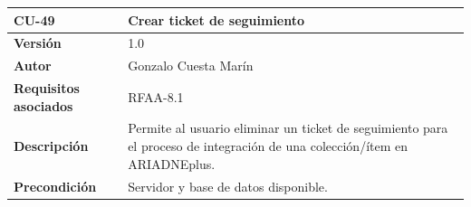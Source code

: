 \documentclass[
]{article}
\begin{document}
\begin{longtable}[]{@{}ll@{}}
\toprule
\begin{minipage}[b]{0.16\columnwidth}\raggedright
\textbf{CU-49}\strut
\end{minipage} & \begin{minipage}[b]{0.78\columnwidth}\raggedright
\textbf{Crear ticket de seguimiento}\strut
\end{minipage}\tabularnewline
\midrule
\endhead
\begin{minipage}[t]{0.16\columnwidth}\raggedright
\textbf{Versión}\strut
\end{minipage} & \begin{minipage}[t]{0.78\columnwidth}\raggedright
1.0\strut
\end{minipage}\tabularnewline
\begin{minipage}[t]{0.16\columnwidth}\raggedright
\textbf{Autor}\strut
\end{minipage} & \begin{minipage}[t]{0.78\columnwidth}\raggedright
Gonzalo Cuesta Marín\strut
\end{minipage}\tabularnewline
\begin{minipage}[t]{0.16\columnwidth}\raggedright
\textbf{Requisitos asociados}\strut
\end{minipage} & \begin{minipage}[t]{0.78\columnwidth}\raggedright
RFAA-8.1\strut
\end{minipage}\tabularnewline
\begin{minipage}[t]{0.16\columnwidth}\raggedright
\textbf{Descripción}\strut
\end{minipage} & \begin{minipage}[t]{0.78\columnwidth}\raggedright
Permite al usuario eliminar un ticket de seguimiento para el proceso de
integración de una colección/ítem en ARIADNEplus.\strut
\end{minipage}\tabularnewline
\begin{minipage}[t]{0.16\columnwidth}\raggedright
\textbf{Precondición}\strut
\end{minipage} & \begin{minipage}[t]{0.78\columnwidth}\raggedright
Servidor y base de datos disponible.


\end{minipage}
\end{longtable}
\end{document}
